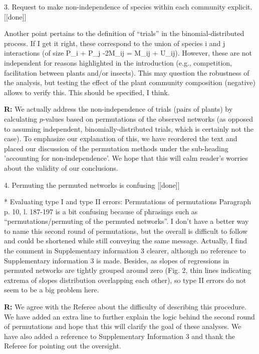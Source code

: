\documentclass[12pt]{letter}
\newenvironment{refquote}{\bigskip \begin{it}}{\end{it}\smallskip}
\begin{document}
3. Request to make non-independence of species within each community explicit. [[done]]

	\begin{refquote}
		Another point pertains to the definition of “trials” in the binomial-distributed process. If I get it right, these correspond to the union of species i and j interactions (of size P_i + P_j -2M_ij = M_ij + U_ij). However, these are not independent for reasons highlighted in the introduction (e.g., competition, facilitation between plants and/or insects). This may question the robustness of the analysis, but testing the effect of the plant community composition (negative) allows to verify this. This should be specified, I think.
	\end{refquote}


	\textbf{R:} We actually address the non-independence of trials (pairs of plants) by calculating $p$-values based on permutations of the observed networks (as opposed to assuming independent, binomially-distributed trials, which is certainly not the case). To emphasize our explanation of this, we have reordered the text and placed our discussion of the permutation methods under the sub-heading 'accounting for non-independence'. We hope that this will calm reader's worries about the validity of our conclusions.


4. Permuting the permuted networks is confusing [[done]]

	\begin{refquote}
		* Evaluating type I and type II errors: Permutations of permutations
		Paragraph p. 10, l. 187-197 is a bit confusing because of phrasings such as “permutations/permuting of the permuted networks”. I don't have a better way to name this second round of permutations, but the overall is difficult to follow and could be shortened while still conveying the same message.
		Actually, I find the comment in Supplementary information 3 clearer, although no reference to Supplementary information 3 is made.
		Besides, as slopes of regressions in permuted networks are tightly grouped around zero (Fig. 2, thin lines indicating 
		extrema of slopes distribution overlapping each other), so type II errors do not seem to be a big problem here.
	\end{refquote}


	\textbf{R:} We agree with the Referee about the difficulty of describing this procedure. We have added an extra line to further explain the logic behind the second round of permutations and hope that this will clarify the goal of these analyses. We have also added a reference to Supplementary Information 3 and thank the Referee for pointing out the oversight.
\end{document}
